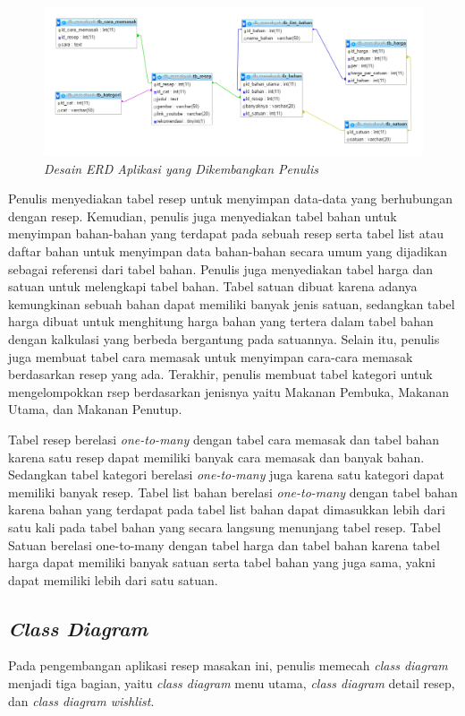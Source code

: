 		\begin{figure}[H]
			\centering
			\includegraphics[width=1.1\textwidth]{gambar/erd_terbaru}
			\caption{\emph{Desain ERD Aplikasi yang Dikembangkan Penulis}}
			\label{erd_aplikasi}
		\end{figure}
		
		Penulis menyediakan tabel resep untuk menyimpan data-data yang berhubungan dengan resep. Kemudian, penulis juga menyediakan tabel bahan untuk menyimpan bahan-bahan yang terdapat pada sebuah resep serta tabel list atau daftar bahan untuk menyimpan data bahan-bahan secara umum yang dijadikan sebagai referensi dari tabel bahan. Penulis juga menyediakan tabel harga dan satuan untuk melengkapi tabel bahan. Tabel satuan dibuat karena adanya kemungkinan sebuah bahan dapat memiliki banyak jenis satuan, sedangkan tabel harga dibuat untuk menghitung harga bahan yang tertera dalam tabel bahan dengan kalkulasi yang berbeda bergantung pada satuannya. Selain itu, penulis juga membuat tabel cara memasak untuk menyimpan cara-cara memasak berdasarkan resep yang ada. Terakhir, penulis membuat tabel kategori untuk mengelompokkan rsep berdasarkan jenisnya yaitu Makanan Pembuka, Makanan Utama, dan Makanan Penutup.
		
		Tabel resep berelasi \textit{one-to-many} dengan tabel cara memasak dan tabel bahan karena satu resep dapat memiliki banyak cara memasak dan banyak bahan. Sedangkan tabel kategori berelasi \textit{one-to-many} juga karena satu kategori dapat memiliki banyak resep. Tabel list bahan berelasi \textit{one-to-many} dengan tabel bahan karena bahan yang terdapat pada tabel list bahan dapat dimasukkan lebih dari satu kali pada tabel bahan yang secara langsung menunjang tabel resep. Tabel Satuan berelasi one-to-many dengan tabel harga dan tabel bahan karena tabel harga dapat memiliki banyak satuan serta tabel bahan yang juga sama, yakni dapat memiliki lebih dari satu satuan.   
	\subsection{\emph{Class Diagram}}
		Pada pengembangan aplikasi resep masakan ini, penulis memecah \textit{class diagram} menjadi tiga bagian, yaitu \textit{class diagram} menu utama, \textit{class diagram} detail resep, dan \textit{class diagram wishlist}.
		
